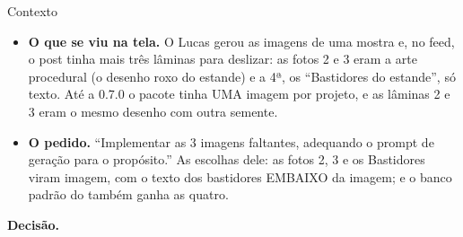 \begin{especificacao}{Contexto}
\begin{itemize}
  \item \textbf{O que se viu na tela.} O Lucas gerou as imagens de uma mostra
    e, no feed, o post tinha mais três lâminas para deslizar: as fotos 2 e 3
    eram a arte procedural (o desenho roxo do estande) e a 4ª, os
    \enquote{Bastidores do estande}, só texto. Até a 0.7.0 o pacote tinha UMA
    imagem por projeto, e as lâminas 2 e 3 eram o mesmo desenho com outra
    semente.
  \item \textbf{O pedido.} \enquote{Implementar as 3 imagens faltantes,
    adequando o prompt de geração para o propósito.} As escolhas dele: as
    fotos 2, 3 e os Bastidores viram imagem, com o texto dos bastidores
    EMBAIXO da imagem; e o banco padrão do  também ganha as quatro.
\end{itemize}
\end{especificacao}

\textbf{Decisão.}

